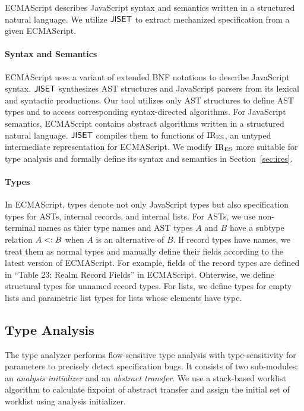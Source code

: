 ECMAScript describes JavaScript syntax and semantics written in a structured
natural language.  We utilize $\textsf{JISET}$ to extract mechanized specification from
a given ECMAScript.

\paragraph{Syntax and Semantics} ECMAScript uses a variant of extended BNF
notations to describe JavaScript syntax.  $\textsf{JISET}$ synthesizes AST structures
and JavaScript parsers from its lexical and syntactic productions.  Our tool
utilizes only AST structures to define AST types and to access corresponding
syntax-directed algorithms.  For JavaScript semantics, ECMAScript contains
abstract algorithms written in a structured natural language.  $\textsf{JISET}$ compiles
them to functions of ${\text{IR}_\text{ES}}$, an untyped intermediate representation for
ECMAScript.  We modify ${\text{IR}_\text{ES}}$ more suitable for type analysis and formally
define its syntax and semantics in Section~\ref{sec:ires}.

\paragraph{Types} In ECMAScript, types denote not only JavaScript types but also
specification types for ASTs, internal records, and internal lists.  For ASTs,
we use non-terminal names as thier type names and AST types $A$ and $B$ have a
subtype relation $A <: B$ when $A$ is an alternative of $B$.  If record
types have names, we treat them as normal types and manually define their fields
according to the latest version of ECMAScript.  For example, fields of the
 record types are defined in ``Table 23: Realm Record Fields'' in
ECMAScript.  Ohterwise, we define structural types for unnamed record types.
For lists, we define  types for empty lists and parametric list types
 for lists whose elements have  type.


\subsection{Type Analysis}\label{sec:overview-type-analysis}

The type analyzer performs flow-sensitive type analysis with type-sensitivity
for parameters to precisely detect specification bugs.  It consists of two
sub-modules: an \textit{analysis initializer} and an \textit{abstract transfer}.
We use a stack-based worklist algorithm to calculate fixpoint of abstract
transfer and assign the initial set of worklist using analysis initializer.

